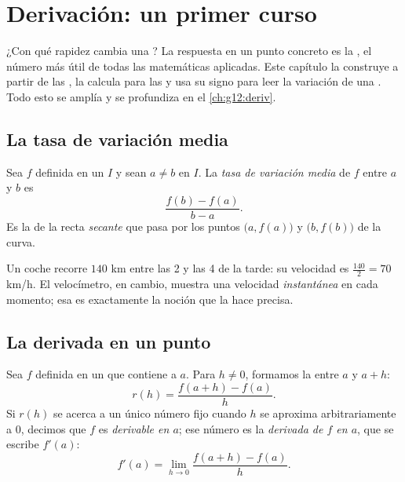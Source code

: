 \chapter{Derivación: un primer curso}\label{ch:g11:deriv}

¿Con qué rapidez cambia una ? La respuesta en un punto concreto es
la \emph{}, el número más útil de todas las matemáticas aplicadas.
Este capítulo la construye a partir de las , la
calcula para las  y usa su signo para leer la
variación de una . Todo esto se amplía y se profundiza en el
\cref{ch:g12:deriv}.

\section{La tasa de variación media}

\begin{definition}\label{def:g11:deriv:rate}
Sea $f$ definida en un  $I$ y sean $a \neq b$ en $I$. La
\emph{tasa de variación media} de $f$ entre
$a$ y $b$ es
\[
\frac{f(b) - f(a)}{b - a}.
\]
Es la  de la recta \emph{secante} que pasa por los
puntos $\bigl(a, f(a)\bigr)$ y $\bigl(b, f(b)\bigr)$ de la curva.
\end{definition}

\begin{example}
Un coche recorre $140$ km entre las 2 y las 4 de la tarde: su velocidad
 es $\frac{140}{2} = 70$ km/h. El velocímetro, en cambio, muestra una
velocidad \emph{instantánea} en cada momento; esa es exactamente la noción
que la  hace precisa.
\end{example}

\section{La derivada en un punto}

\begin{definition}\label{def:g11:deriv:derivative}
Sea $f$ definida en un  que contiene a $a$. Para $h \neq 0$,
formamos la  entre $a$ y $a + h$:
\[
r(h) = \frac{f(a+h) - f(a)}{h}.
\]
Si $r(h)$ se acerca a un único número fijo cuando $h$ se aproxima
arbitrariamente a $0$, decimos que $f$ es \emph{derivable en
$a$}; ese número es la \emph{derivada de
$f$ en $a$}, que se escribe $f'(a)$:
\[
f'(a) = \lim_{h \to 0} \frac{f(a+h) - f(a)}{h}.
\]
\end{definition}

